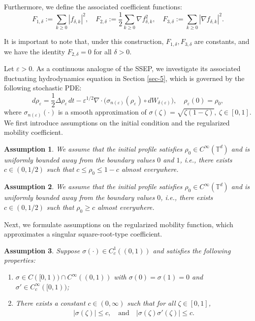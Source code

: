 \documentclass[UTF-8,reqno]{amsart}
\numberwithin{equation}{section}
\newtheorem{assumption}{Assumption}[section]
\def\geq{\geqslant}
\def\leq{\leqslant}
\def\geq{\geqslant}
\def\leq{\leqslant}
\begin{document}
Furthermore, we define the associated coefficient functions:
\begin{equation*}
	F_{1,\delta} := \sum_{k \geq 0} |f_{\delta,k}|^2, \quad 
	F_{2,\delta} := \frac{1}{2} \sum_{k \geq 0} \nabla f_{\delta,k}^2, \quad 
	F_{3,\delta} := \sum_{k \geq 0} |\nabla f_{\delta,k}|^2.
\end{equation*}

It is important to note that, under this construction, $F_{1,\delta},F_{3,\delta}$ are constants, and we have the identity $F_{2,\delta} = 0$ for all $\delta > 0$. 

Let $\varepsilon>0$. As a continuous analogue of the SSEP, we investigate its associated fluctuating hydrodynamics equation in Section \ref{sec-5}, which is governed by the following stochastic PDE:
\begin{equation}\label{SPDE-1}
d\rho_{\varepsilon} = \frac{1}{2}\Delta\rho_{\varepsilon}\,dt - \varepsilon^{1/2} \nabla\cdot\Big(\sigma_{n(\varepsilon)}(\rho_{\varepsilon}) \circ dW_{\delta(\varepsilon)}\Big), \quad \rho_{\varepsilon}(0) = \rho_0, 
\end{equation}
where $\sigma_{n(\varepsilon)}(\cdot)$ is a smooth approximation of  $\sigma(\zeta)=\sqrt{\zeta(1-\zeta)},\ \zeta\in[0,1]$. We first introduce assumptions on the initial condition and the regularized mobility coefficient.

\begin{assumption}\label{Assump-initial-1}
We assume that the initial profile satisfies $\rho_0 \in C^{\infty}(\mathbb{T}^d)$ and is uniformly bounded away from the boundary values $0$ and $1$, i.e., there exists $c \in (0,1/2)$ such that $c \leq \rho_0 \leq 1 - c$ almost everywhere.
\end{assumption}

\begin{assumption}\label{Assump-initial-2}
We assume that the initial profile satisfies $\rho_0 \in C^{\infty}(\mathbb{T}^d)$ and is uniformly bounded away from the boundary values $0$, i.e., there exists $c \in (0,1/2)$ such that $\rho_0 \geq c$ almost everywhere.
\end{assumption}

Next, we formulate assumptions on the regularized mobility function, which approximates a singular square-root-type coefficient.

\begin{assumption}\label{Assump-sigman}
Suppose $\sigma(\cdot) \in C^{1}_{c}((0,1))$ and satisfies the following properties:
\begin{enumerate}
    \item[(1)] $\sigma \in C([0,1)) \cap C^{\infty}((0,1))$ with $\sigma(0)=\sigma(1)=0$ and $\sigma' \in C^{\infty}_c([0,1))$;
    \item[(2)] There exists a constant $c \in (0,\infty)$ such that for all $\zeta \in [0,1]$,
    \begin{align}
        |\sigma(\zeta)| \leq c, \quad \text{and} \quad |\sigma(\zeta)\sigma'(\zeta)| \leq c.
    \end{align}
\end{enumerate}
\end{assumption}
\end{document}

